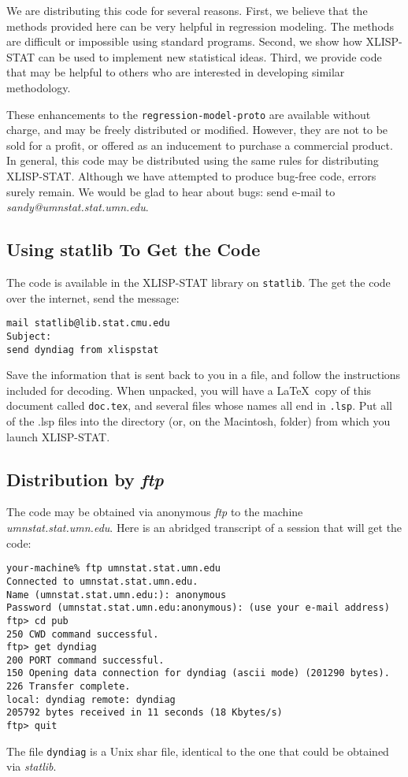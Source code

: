 We are distributing this code for several reasons.  First, we believe that the
methods provided here can be very helpful in regression
modeling.  The methods are difficult or impossible using standard programs.
Second, we show how XLISP-STAT can be used to implement new statistical
ideas.  Third, we provide code that may be helpful to others who are
interested in developing similar methodology.

These enhancements to the {\tt regression-model-proto} are available without
charge, and may be freely distributed or modified.  However, they are not to
be sold for a profit, or offered as an inducement to purchase a commercial
product.  In general, this code may be distributed using the same rules for
distributing XLISP-STAT.  Although we have attempted to produce bug-free code,
errors surely remain.  We would be glad to hear about bugs:  send e-mail to
{\sl sandy@umnstat.stat.umn.edu}.

\subsection{Using statlib To Get the Code}
The code
is available 
in the XLISP-STAT library on {\tt statlib}.  
The get the code over the internet, send the message:
\begin{verbatim}
mail statlib@lib.stat.cmu.edu
Subject:
send dyndiag from xlispstat
\end{verbatim}
Save the information that is sent back to you in a file, and follow the
instructions included for decoding.  When unpacked, 
you will have a \LaTeX\ copy of this document called 
{\tt doc.tex}, and several files whose
names all end in {\tt .lsp}.
Put all of the .lsp files into the directory (or, on the Macintosh, folder)
from which you launch XLISP-STAT.  

\subsection{Distribution by {\sl ftp}}
The code may be obtained via anonymous {\sl ftp} to the machine {\sl
umnstat.stat.umn.edu}.  Here is an abridged transcript of a session that will
get the code:
\begin{verbatim}
your-machine% ftp umnstat.stat.umn.edu
Connected to umnstat.stat.umn.edu.
Name (umnstat.stat.umn.edu:): anonymous  
Password (umnstat.stat.umn.edu:anonymous): (use your e-mail address)
ftp> cd pub
250 CWD command successful.
ftp> get dyndiag
200 PORT command successful.
150 Opening data connection for dyndiag (ascii mode) (201290 bytes).
226 Transfer complete.
local: dyndiag remote: dyndiag
205792 bytes received in 11 seconds (18 Kbytes/s)
ftp> quit
\end{verbatim}
The file {\tt dyndiag} is a Unix shar file, identical to the one that could be
obtained via {\sl statlib}.

